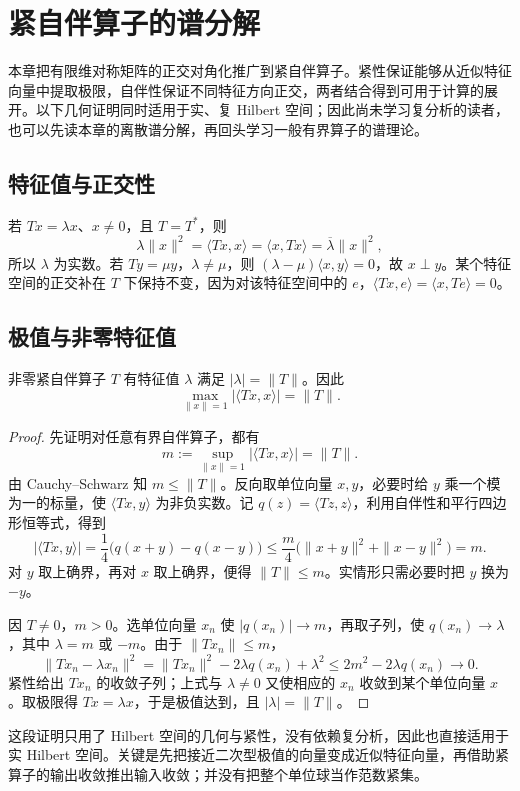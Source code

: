 \setcounter{chapter}{11} %
\chapter{紧自伴算子的谱分解}
\label{chap:fa-compact-spectral}

本章把有限维对称矩阵的正交对角化推广到紧自伴算子。紧性保证能够从近似特征向量中提取极限，自伴性保证不同特征方向正交，两者结合得到可用于计算的展开。以下几何证明同时适用于实、复 Hilbert 空间；因此尚未学习复分析的读者，也可以先读本章的离散谱分解，再回头学习一般有界算子的谱理论。

\section{特征值与正交性}
若 $Tx=\lambda x$、$x\ne0$，且 $T=T^*$，则
\[
 \lambda\|x\|^2=\langle Tx,x\rangle
 =\langle x,Tx\rangle=\overline\lambda\|x\|^2,
\]
所以 $\lambda$ 为实数。若 $Ty=\mu y$，$\lambda\ne\mu$，则 $(\lambda-\mu)\langle x,y\rangle=0$，故 $x\perp y$。某个特征空间的正交补在 $T$ 下保持不变，因为对该特征空间中的 $e$，$\langle Tx,e\rangle=\langle x,Te\rangle=0$。

\section{极值与非零特征值}
\begin{proposition}\label{prop:fa-compact-extreme}
非零紧自伴算子 $T$ 有特征值 $\lambda$ 满足 $|\lambda|=\|T\|$。因此
\[
 \max_{\|x\|=1}|\langle Tx,x\rangle|=\|T\|.
\]
\end{proposition}
\begin{proof}
先证明对任意有界自伴算子，都有
\[
 m:=\sup_{\|x\|=1}|\langle Tx,x\rangle|=\|T\|.
\]
由 Cauchy--Schwarz 知 $m\leq\|T\|$。反向取单位向量 $x,y$，必要时给 $y$ 乘一个模为一的标量，使 $\langle Tx,y\rangle$ 为非负实数。记 $q(z)=\langle Tz,z\rangle$，利用自伴性和平行四边形恒等式，得到
\[
 |\langle Tx,y\rangle|
 =\frac14\bigl(q(x+y)-q(x-y)\bigr)
 \leq\frac m4\bigl(\|x+y\|^2+\|x-y\|^2\bigr)=m.
\]
对 $y$ 取上确界，再对 $x$ 取上确界，便得 $\|T\|\leq m$。实情形只需必要时把 $y$ 换为 $-y$。

因 $T\ne0$，$m>0$。选单位向量 $x_n$ 使 $|q(x_n)|\to m$，再取子列，使 $q(x_n)\to\lambda$，其中 $\lambda=m$ 或 $-m$。由于 $\|Tx_n\|\leq m$，
\[
 \|Tx_n-\lambda x_n\|^2
 =\|Tx_n\|^2-2\lambda q(x_n)+\lambda^2
 \leq 2m^2-2\lambda q(x_n)\longrightarrow0.
\]
紧性给出 $Tx_n$ 的收敛子列；上式与 $\lambda\ne0$ 又使相应的 $x_n$ 收敛到某个单位向量 $x$。取极限得 $Tx=\lambda x$，于是极值达到，且 $|\lambda|=\|T\|$。
\end{proof}
这段证明只用了 Hilbert 空间的几何与紧性，没有依赖复分析，因此也直接适用于实 Hilbert 空间。关键是先把接近二次型极值的向量变成近似特征向量，再借助紧算子的输出收敛推出输入收敛；并没有把整个单位球当作范数紧集。

